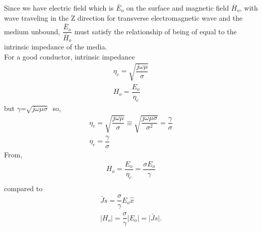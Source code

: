 Since we have electric field which is $\bar{E}$$_o$ on the surface and magnetic field $\bar{H}$$_o$, with wave traveling in the Z direction for transverse electromagnetic wave and the medium unbound, $\dfrac{\bar{E}_o}{\bar{H}_o}$ must satisfy the relationship of being of equal to the intrinsic impedance of the media.\\
For a good conductor, intrinsic impedance
\begin{align}
\eta_{c}=\sqrt{\dfrac{j\omega\mu}{\sigma}}\\
H_{o}=\dfrac{E_{o}}{\eta_{c}}
\end{align} 
but $\gamma$=$\sqrt{j\omega\mu\sigma}$\ so,\\
\begin{align}
\eta_{c}=\sqrt{\dfrac{j\omega\mu}{\sigma}}\equiv\sqrt{\dfrac{j\omega\mu\sigma}{\sigma^{2}}}=\dfrac{\gamma}{\sigma}\\
\eta_{c}=\dfrac{\gamma}{\sigma}
\end{align}
From,
\begin{align}
H_{o}=\dfrac{E_{o}}{\eta_{c}}=\dfrac{\sigma E_{o}}{\gamma}\\
\end{align}
compared to 
\begin{align}
\bar{J}s=\dfrac{\sigma}{\gamma}E_{o}\hat{x}\\
\lvert H_{o}\rvert=\dfrac{\sigma}{\gamma}\lvert E_{o}\rvert=\rvert \bar{J}s\rvert.
\end{align}\\

